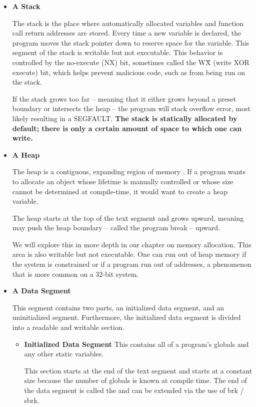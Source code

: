 \begin{itemize}
\item \textbf{A Stack}

The stack is the place where automatically allocated variables and function call return addresses are stored.
Every time a new variable is declared, the program moves the stack pointer down to reserve space for the variable.
This segment of the stack is writable but not executable.
This behavior is controlled by the no-execute (NX) bit, sometimes called the W\^X (write XOR execute) bit, which helps prevent malicious code, such as  from being run on the stack.

If the stack grows too far -- meaning that it either grows beyond a preset boundary or intersects the heap -- the program will stack overflow error, most likely resulting in a SEGFAULT.
\textbf{The stack is statically allocated by default; there is only a certain amount of space to which one can write.}

\item \textbf{A Heap}

The heap is a contiguous, expanding region of memory \cite{mallocinternals}.
If a program wants to allocate an object whose lifetime is manually controlled or whose size cannot be determined at compile-time, it would want to create a heap variable.

The heap starts at the top of the text segment and grows upward, meaning  may push the heap boundary -- called the program break -- upward.

We will explore this in more depth in our chapter on memory allocation.
This area is also writable but not executable.
One can run out of heap memory if the system is constrained or if a program run out of addresses, a phenomenon that is more common on a 32-bit system.

\item \textbf{A Data Segment}

This segment contains two parts, an initialized data segment, and an uninitialized segment.
Furthermore, the initialized data segment is divided into a readable and writable section.

\begin{itemize}
    \item \textbf{Initialized Data Segment}
          This contains all of a program's globals and any other static variables.

          This section starts at the end of the text segment and starts at a constant size because the number of globals is known at compile time. The end of the data segment is called the  and can be extended via the use of brk / sbrk.


\end{itemize}
\end{itemize}
